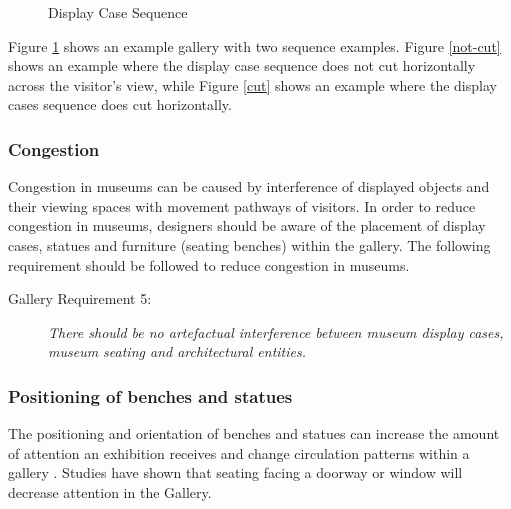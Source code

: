 \documentclass[12pt]{ucthesis}
\begin{document}
\begin{figure}[H]\label{cut-horizontal}
\centering
{}
\hspace{10 mm}
\caption{Display Case Sequence}
\end{figure}

Figure \ref{cut-horizontal} shows an example gallery with two sequence examples. Figure \ref{not-cut} shows an example where the display case sequence does not cut horizontally across the visitor's view, while Figure \ref{cut} shows an example where the display cases sequence does cut horizontally.

\subsubsection{Congestion}
Congestion in museums can be caused by interference of displayed objects and their viewing spaces with movement pathways of visitors. In order to reduce congestion in museums, designers should be aware of the placement of display cases, statues and furniture (seating benches) within the gallery. The following requirement should be followed to reduce congestion in museums.

\begin{description}
\item[Gallery Requirement 5:] \emph{There should be no artefactual interference between museum display cases, museum seating and architectural entities.}
\end{description}


\subsubsection{Positioning of benches and statues}
The positioning and orientation of benches and statues can increase the amount of attention an exhibition receives and change circulation patterns within a gallery \cite{Stavroulaki} \cite{Museum}. Studies have shown that seating facing a doorway or window will decrease attention in the Gallery.
\end{document}
